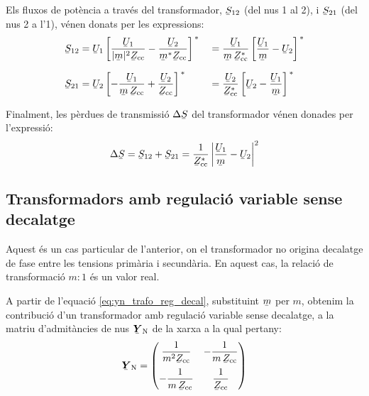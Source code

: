 Els fluxos de potència a través del transformador, $\cmplx{S}_{12}$
(del nus 1 al 2), i $\cmplx{S}_{21}$ (del nus 2 a l'1), vénen donats
per les expressions: 
\begin{alignat}{2}
   \cmplx{S}_{12} &= \cmplx{U}_1 \left[ \frac{\cmplx{U}_1}{|\cmplx{m}|^2 \cmplx{Z}\ped{cc}} - \frac{\cmplx{U}_2}{\cmplx{m}^* \cmplx{Z}\ped{cc}} \right]^{\,*} &&= \frac{\cmplx{U}_1}{\cmplx{m}\, \cmplx{Z}\ped{cc}^*} \left[ \frac{\cmplx{U}_1}{\cmplx{m}} - \cmplx{U}_2 \right]^{\,*} \label{eq:s12_trafo_reg_decal} \\[1.5ex]
   \cmplx{S}_{21} &= \cmplx{U}_2 \left[ - \frac{\cmplx{U}_1}{\cmplx{m} \,\cmplx{Z}\ped{cc}} + \frac{\cmplx{U}_2} {\cmplx{Z}\ped{cc}} \right]^{\,*} &&= \frac{\cmplx{U}_2}{\cmplx{Z}\ped{cc}^*} \left[  \cmplx{U}_2 - \frac{\cmplx{U}_1}{\cmplx{m}}  \right]^{\,*} \label{eq:s21_trafo_reg_decal}
\end{alignat}

Finalment, les pèrdues de transmissió $\Delta\cmplx{S}$ del transformador vénen donades per l'expressió:
\begin{equation} \label{eq:ds_trafo_reg_decal}
   \Delta\cmplx{S} = \cmplx{S}_{12} + \cmplx{S}_{21} = \frac{1}{\cmplx{Z}\ped{cc}^*}  \left|
    \frac{\cmplx{U}_1}{\cmplx{m}} - \cmplx{U}_2 \right|^2
\end{equation}


\subsection{Transformadors amb regulació variable sense decalatge} \label{sec:trafo_reg}

Aquest és un cas particular de l'anterior, on el transformador no
origina decalatge de fase entre les tensions primària i secundària.
En aquest cas, la relació de transformació $m\!:\!1$ és un valor real.

A partir de l'equació  \eqref{eq:yn_trafo_reg_decal}, substituint
$\cmplx{m}$ per $m$, obtenim la contribució d'un transformador amb
regulació variable sense decalatge, a la matriu d'admitàncies de nus
$\mcmplx{Y}\ped{N}$ de la xarxa a la qual pertany:
\begin{equation}
   \mcmplx{Y}\ped{N} = \begin{pmatrix}
     \dfrac{1}{m^2 \cmplx{Z}\ped{cc}} & - \dfrac{1}{m \,\cmplx{Z}\ped{cc}} \\[2.5ex]
     - \dfrac{1}{m \,\cmplx{Z}\ped{cc}} & \dfrac{1}{\cmplx{Z}\ped{cc}}
   \end{pmatrix}
\end{equation}

